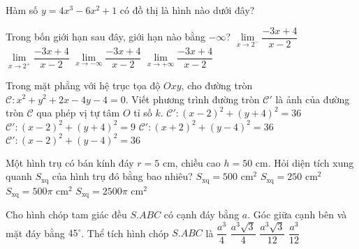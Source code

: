 \begin{ex}
{
}
Hàm số $y=4x^3-6x^2+1$ có đồ thị là hình nào dưới đây?
\haicot{\True \HA}{\HB}{\HC}{\HD}
\end{ex}
\begin{ex}%
Trong bốn giới hạn sau đây, giới hạn nào bằng $-\infty$?
\choice
{$\displaystyle\lim\limits_{x\to 2^-}\dfrac{-3x+4}{x-2}$}
{\True $\displaystyle\lim\limits_{x\to 2^+}\dfrac{-3x+4}{x-2}$}
{$\displaystyle\lim\limits_{x\to -\infty}\dfrac{-3x+4}{x-2}$}
{$\displaystyle\lim\limits_{x\to +\infty}\dfrac{-3x+4}{x-2}$}
\end{ex}
\begin{ex}%
Trong mặt phẳng với hệ trục tọa độ $Oxy$, cho đường tròn $\mathscr{C}: x^2+y^2+2x-4y-4=0$. Viết phương trình đường tròn $\mathscr{C'}$ là ảnh của đường tròn $\mathscr{C}$ qua phép vị tự tâm $O$ tỉ số $k$.
\choice
{\True $\mathscr{C'}:(x-2)^2+(y+4)^2=36$}
{$\mathscr{C'}:(x-2)^2+(y+4)^2=9$}
{$\mathscr{C'}:(x+2)^2+(y-4)^2=36$}
{$\mathscr{C'}:(x-2)^2+(y-4)^2=36$}
\end{ex}
\begin{ex}%
Một hình trụ có bán kính đáy $r=5$ cm, chiều cao $h=50$ cm. Hỏi diện tích xung quanh $S_{\text{xq}}$ của hình trụ đó bằng bao nhiêu?
\choice
{$S_{\text{xq}}=500$ cm$^2$}
{$S_{\text{xq}}=250$ cm$^2$}
{\True $S_{\text{xq}}=500\pi$ cm$^2$}
{$S_{\text{xq}}=2500\pi$ cm$^2$}
\end{ex}
\begin{ex}%
Cho hình chóp tam giác đều $S.ABC$ có cạnh đáy bằng $a$. Góc giữa cạnh bên và mặt đáy bằng $45^\circ$. Thể tích hình chóp $S.ABC$ là
\choice
{$\dfrac{a^3}{4}$}
{$\dfrac{a^3\sqrt{3}}{4}$}
{$\dfrac{a^3\sqrt{3}}{12}$}
{\True $\dfrac{a^3}{12}$}
\end{ex}
